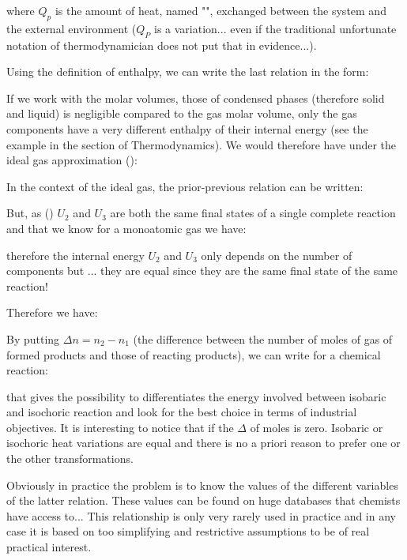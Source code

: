 	where $Q_p$ is the amount of heat, named "", exchanged between the system and the external environment ($Q_P$ is a variation... even if the traditional unfortunate notation of thermodynamician does not put that in evidence...).
	
	Using the definition of enthalpy, we can write the last relation in the form:
	
	If we work with the molar volumes, those of condensed phases (therefore solid and liquid) is negligible compared to the gas molar volume, only the gas components have a very different enthalpy of their internal energy (see the example in the section of Thermodynamics). We would therefore have under the ideal gas approximation ():
	
	In the context of the ideal gas, the prior-previous relation can be written:
	
	But, as () $U_2$ and $U_3$ are both the same final states of a single complete reaction and that we know for a monoatomic gas we have:
	
	therefore the internal energy $U_2$ and $U_3$ only depends on the number of components but ... they are equal since they are the same final state of the same reaction!
	
	Therefore we have:
	
	By putting $\Delta n=n_2-n_1$ (the difference between the number of moles of gas of formed products and those of reacting products), we can write for a chemical reaction:
	
	that gives the possibility to differentiates the energy involved between isobaric and isochoric reaction and look for the best choice in terms of industrial objectives. It is interesting to notice that if the $\Delta$ of moles is zero. Isobaric or isochoric heat variations are equal and there is no a priori reason to prefer one or the other transformations.
	
	Obviously in practice the problem is to know the values of the different variables of the latter relation. These values can be found on huge databases that chemists have access to... This relationship is only very rarely used in practice and in any case it is based on too simplifying and restrictive assumptions to be of real practical interest.
	
	\pagebreak
